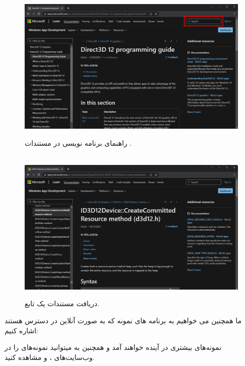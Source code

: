 {    \begin{figure}[H]
        \centering
        \includegraphics[width=\textwidth]{Images/1.Intro.1.1.png}
        \caption{راهنمای برنامه نویسی  در مستندات .} \\[25pt]
        \includegraphics[width=\textwidth]{Images/1.Intro.1.2.png}
        \caption{دریافت مستندات یک تابع.}
    \end{figure}

ما همچنین می خواهیم به برنامه های نمونه  که به صورت آنلاین در دسترس هستند اشاره کنیم:


نمونه‌های بیشتری در آینده خواهند آمد و همچنین به میتوانید نمونه‌های  را در وب‌سایت‌های ،  و  مشاهده کنید.
} \\[25pt]

